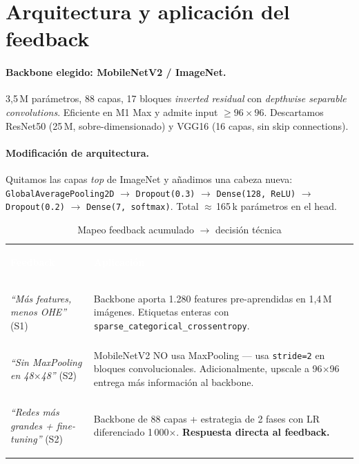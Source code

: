 \documentclass[10pt,a4paper,twocolumn]{article}
\begin{document}
\section{Arquitectura y aplicación del feedback}

\paragraph{Backbone elegido: MobileNetV2 / ImageNet.} 3,5\,M parámetros, 88 capas, 17 bloques \textit{inverted residual} con \textit{depthwise separable convolutions}. Eficiente en M1 Max y admite input $\geq 96\times 96$. Descartamos ResNet50 (25\,M, sobre-dimensionado) y VGG16 (16 capas, sin skip connections).

\paragraph{Modificación de arquitectura.} Quitamos las capas \textit{top} de ImageNet y añadimos una cabeza nueva: \texttt{GlobalAveragePooling2D} $\rightarrow$ \texttt{Dropout(0.3)} $\rightarrow$ \texttt{Dense(128, ReLU)} $\rightarrow$ \texttt{Dropout(0.2)} $\rightarrow$ \texttt{Dense(7, softmax)}. Total $\approx$\,165\,k parámetros en el head.

\begin{table}[H]
\centering
\caption{Mapeo feedback acumulado $\rightarrow$ decisión técnica}
\label{tab:feedback}
\footnotesize
\renewcommand{\arraystretch}{1.25}
\begin{tabularx}{\columnwidth}{>{\bfseries\raggedright\arraybackslash}p{2.6cm} X}
\rowcolor{tableheader}\textcolor{white}{\textbf{Feedback}} & \textcolor{white}{\textbf{Aplicación}}\\
\textit{``Más features, menos OHE''} (S1) & Backbone aporta 1.280 features pre-aprendidas en 1,4\,M imágenes. Etiquetas enteras con \texttt{sparse\_categorical\_crossentropy}. \\
\textit{``Sin MaxPooling en 48$\times$48''} (S2) & MobileNetV2 NO usa MaxPooling — usa \texttt{stride=2} en bloques convolucionales. Adicionalmente, upscale a 96$\times$96 entrega más información al backbone. \\
\textit{``Redes más grandes + fine-tuning''} (S2) & Backbone de 88 capas + estrategia de 2 fases con LR diferenciado 1\,000$\times$. \textbf{Respuesta directa al feedback.} \\
\end{tabularx}
\end{table}
\end{document}
